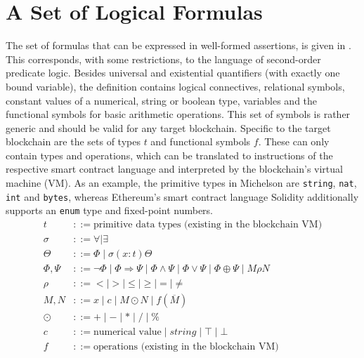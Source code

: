 \section{A Set of Logical Formulas}\label{sec:formulae}
The set of formulas that can be expressed in well-formed assertions, is given in . This corresponds, with some restrictions, to the language of second-order predicate logic. Besides universal and existential quantifiers (with exactly one bound variable), the definition contains logical connectives, relational symbols, constant values of a numerical, string or boolean type, variables and the functional symbols for basic arithmetic operations. This set of symbols is rather generic and should be valid for any target blockchain. Specific to the target blockchain are the sets of types $t$ and functional symbols $f$. These can only contain types and operations, which can be translated to instructions of the respective smart contract language and interpreted by the blockchain's virtual machine (VM). As an example, the primitive types in Michelson are \texttt{string}, \texttt{nat}, \texttt{int} and \texttt{bytes}, whereas Ethereum's smart contract language Solidity \cite{solidity_docs} additionally supports an \texttt{enum} type and fixed-point numbers.
\begin{align*}
    t &::= \text{primitive data types (existing in the blockchain VM)} \\
    \sigma &::= \forall \mid \exists \\
    \Theta &::= \Phi \mid \sigma (x:t) \Theta \\
    \Phi,\Psi &::= \neg\Phi \mid \Phi \Rightarrow \Psi \mid \Phi\wedge\Psi \mid
    				\Phi\vee\Psi \mid \Phi \oplus \Psi \mid M \rho N \\
    \rho &::= < \mid > \mid \le \mid \ge \mid = \mid \ne \\
    M, N &::= x \mid c \mid M \odot N  \mid f (\overline M) \\
    \odot &::= +\mid -\mid * \mid / \mid \% \\
    c &::= \text{numerical value} \mid string \mid \top \mid \bot \\
    f &::= \text{operations (existing in the blockchain VM)}
\end{align*}
\begingroup\vspace*{-\baselineskip}
\label{fig:formulas}
\vspace*{\baselineskip}\endgroup

